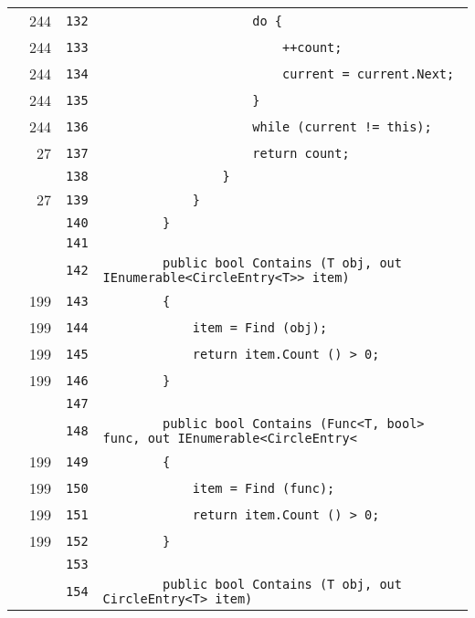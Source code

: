 \documentclass[a4paper,10pt]{article}
\begin{document}
\begin{longtable}[l]{lrrl}
\cellcolor{green} & 244 & \verb~132~ & \verb~                    do {~\\
\cellcolor{green} & 244 & \verb~133~ & \verb~                        ++count;~\\
\cellcolor{green} & 244 & \verb~134~ & \verb~                        current = current.Next;~\\
\cellcolor{green} & 244 & \verb~135~ & \verb~                    }~\\
\cellcolor{green} & 244 & \verb~136~ & \verb~                    while (current != this);~\\
\cellcolor{green} & 27 & \verb~137~ & \verb~                    return count;~\\
\cellcolor{gray} &  & \verb~138~ & \verb~                }~\\
\cellcolor{green} & 27 & \verb~139~ & \verb~            }~\\
\cellcolor{gray} &  & \verb~140~ & \verb~        }~\\
\cellcolor{gray} &  & \verb~141~ & \verb~~\\
\cellcolor{gray} &  & \verb~142~ & \verb~        public bool Contains (T obj, out IEnumerable<CircleEntry<T>> item)~\\
\cellcolor{green} & 199 & \verb~143~ & \verb~        {~\\
\cellcolor{green} & 199 & \verb~144~ & \verb~            item = Find (obj);~\\
\cellcolor{green} & 199 & \verb~145~ & \verb~            return item.Count () > 0;~\\
\cellcolor{green} & 199 & \verb~146~ & \verb~        }~\\
\cellcolor{gray} &  & \verb~147~ & \verb~~\\
\cellcolor{gray} &  & \verb~148~ & \verb~        public bool Contains (Func<T, bool> func, out IEnumerable<CircleEntry<~\\
\cellcolor{green} & 199 & \verb~149~ & \verb~        {~\\
\cellcolor{green} & 199 & \verb~150~ & \verb~            item = Find (func);~\\
\cellcolor{green} & 199 & \verb~151~ & \verb~            return item.Count () > 0;~\\
\cellcolor{green} & 199 & \verb~152~ & \verb~        }~\\
\cellcolor{gray} &  & \verb~153~ & \verb~~\\
\cellcolor{gray} &  & \verb~154~ & \verb~        public bool Contains (T obj, out CircleEntry<T> item)~\\

\end{longtable}
\end{document}
